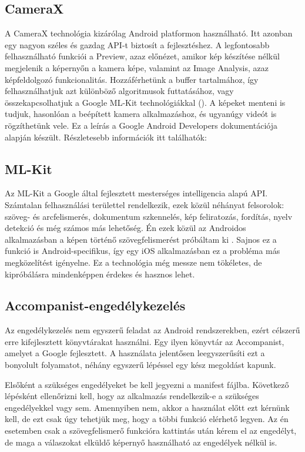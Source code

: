 \subsection{CameraX}

A CameraX technológia kizárólag Android platformon használható.  
Itt azonban egy nagyon széles és gazdag API-t biztosít a fejlesztéshez.  
A legfontosabb felhasználható funkciói a Preview, azaz előnézet, amikor kép készítése nélkül megjelenik a képernyőn a kamera képe, valamint az Image Analysis, azaz képfeldolgozó funkcionalitás.  
Hozzáférhetünk a buffer tartalmához, így felhasználhatjuk azt különböző algoritmusok futtatásához, vagy összekapcsolhatjuk a Google ML-Kit technológiákkal ().  
A képeket menteni is tudjuk, hasonlóan a beépített kamera alkalmazáshoz, és ugyanúgy videót is rögzíthetünk vele.  
Ez a leírás a Google Android Developers dokumentációja alapján készült. Részletesebb információk itt találhatók: \cite{CameraX}

\subsection{ML-Kit}
\label{sec:MLKit}

Az ML-Kit a Google által fejlesztett mesterséges intelligencia alapú API.  
Számtalan felhasználási területtel rendelkezik, ezek közül néhányat felsorolok: szöveg- és arcfelismerés, dokumentum szkennelés, kép feliratozás, fordítás, nyelv detekció és még számos más lehetőség.  
Én ezek közül az Androidos alkalmazásban a képen történő szövegfelismerést próbáltam ki \cite{MLKit}.  
Sajnos ez a funkció is Android-specifikus, így egy iOS alkalmazásban ez a probléma más megközelítést igényelne.  
Ez a technológia még messze nem tökéletes, de kipróbálásra mindenképpen érdekes és hasznos lehet.

\subsection{Accompanist-engedélykezelés}

Az engedélykezelés nem egyszerű feladat az Android rendszerekben, ezért célszerű erre kifejlesztett könyvtárakat használni.  
Egy ilyen könyvtár az Accompanist, amelyet a Google fejlesztett.  
A használata jelentősen leegyszerűsíti ezt a bonyolult folyamatot, néhány egyszerű lépéssel egy kész megoldást kapunk.

Elsőként a szükséges engedélyeket be kell jegyezni a manifest fájlba.  
Következő lépésként ellenőrizni kell, hogy az alkalmazás rendelkezik-e a szükséges engedélyekkel vagy sem.  
Amennyiben nem, akkor a használat előtt ezt kérnünk kell, de ezt csak úgy tehetjük meg, hogy a többi funkció elérhető legyen.  
Az én esetemben csak a szövegfelismerő funkcióra kattintás után kérem el az engedélyt, de maga a válaszokat elküldő képernyő használható az engedélyek nélkül is.  

